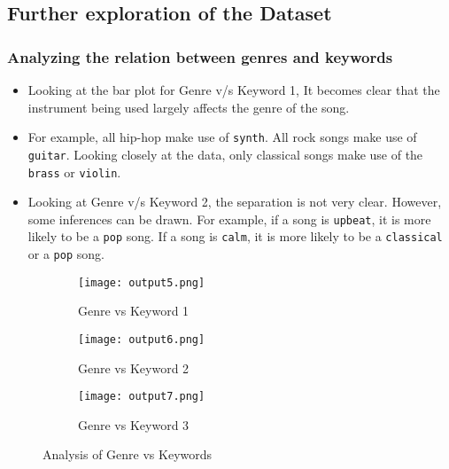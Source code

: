 \documentclass{article}
\begin{document}
\subsection{Further exploration of the Dataset}
\subsubsection{Analyzing the relation between genres and keywords}
\begin{itemize}
    \item Looking at the bar plot for Genre v/s Keyword 1, It becomes clear that the instrument being used largely affects the genre of the song.
    \item For example, all hip-hop make use of \texttt{synth}. All rock songs make use of \texttt{guitar}. Looking closely at the data, only classical songs make use of the \texttt{brass} or \texttt{violin}.
    \item Looking at Genre v/s Keyword 2, the separation is not very clear. However, some inferences can be drawn. For example, if a song is \texttt{upbeat}, it is more likely to be a \texttt{pop} song. If a song is \texttt{calm}, it is more likely to be a \texttt{classical} or a \texttt{pop} song.
\end{itemize}
\begin{figure}[h]
    \centering
    \begin{subfigure}[b]{0.3\textwidth}
        \centering
        \texttt{[image: output5.png]}
        \caption{Genre vs Keyword 1}
        \label{fig:genre_keyword1}
    \end{subfigure}
    \hfill
    \begin{subfigure}[b]{0.3\textwidth}
        \centering
        \texttt{[image: output6.png]}
        \caption{Genre vs Keyword 2}
        \label{fig:genre_keyword2}
    \end{subfigure}
    \hfill
    \begin{subfigure}[b]{0.3\textwidth}
        \centering
        \texttt{[image: output7.png]}
        \caption{Genre vs Keyword 3}
        \label{fig:genre_keyword3}
    \end{subfigure}
    \caption{Analysis of Genre vs Keywords}
    \label{fig:genre_keywords}
\end{figure}
\end{document}
